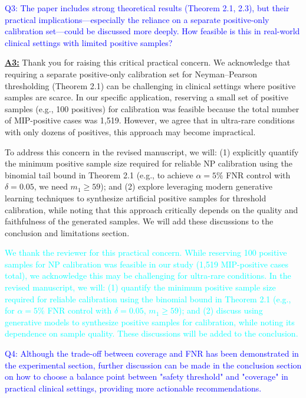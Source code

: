 \documentclass[UTF8,12pt]{article}
\begin{document}
\textcolor{blue}{Q3: The paper includes strong theoretical results (Theorem 2.1, 2.3), but their practical implications—especially the reliance on a separate positive-only calibration set—could be discussed more deeply. How feasible is this in real-world clinical settings with limited positive samples?}

\underline{{\bf A3:}} Thank you for raising this critical practical concern. We acknowledge that requiring a separate positive-only calibration set for Neyman–Pearson thresholding (Theorem 2.1) can be challenging in clinical settings where positive samples are scarce. In our specific application, reserving a small set of positive samples (e.g., 100 positives) for calibration was feasible because the total number of MIP-positive cases was 1,519. However, we agree that in ultra-rare conditions with only dozens of positives, this approach may become impractical.

To address this concern in the revised manuscript, we will: (1) explicitly quantify the minimum positive sample size required for reliable NP calibration using the binomial tail bound in Theorem 2.1 (e.g., to achieve $\alpha=5\%$ FNR control with $\delta=0.05$, we need $m_1 \geq 59$); and (2) explore leveraging modern generative learning techniques to synthesize artificial positive samples for threshold calibration, while noting that this approach critically depends on the quality and faithfulness of the generated samples. We will add these discussions to the conclusion and limitations section.

\textcolor{cyan}{We thank the reviewer for this practical concern. While reserving 100 positive samples for NP calibration was feasible in our study (1,519 MIP-positive cases total), we acknowledge this may be challenging for ultra-rare conditions. In the revised manuscript, we will: (1) quantify the minimum positive sample size required for reliable calibration using the binomial bound in Theorem 2.1 (e.g., for \(\alpha=5\%\) FNR control with \(\delta=0.05\), \(m_1 \geq 59\)); and (2) discuss using generative models to synthesize positive samples for calibration, while noting its dependence on sample quality. These discussions will be added to the conclusion.}

\textcolor{blue}{Q4: Although the trade-off between coverage and FNR has been demonstrated in the experimental section, further discussion can be made in the conclusion section on how to choose a balance point between "safety threshold" and "coverage" in practical clinical settings, providing more actionable recommendations.}
\end{document}
